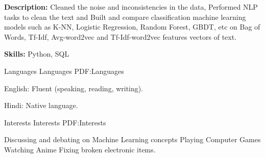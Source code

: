 \documentclass[letterpaper,MMMyyyy,nonstopmode]{simpleresumecv}
\begin{document}
\begin{Body}
            \Gap

            \Item
                \textbf{Description:}
                Cleaned the noise and inconsistencies in the data, 
                Performed NLP tasks to clean the text and 
                Built and compare classification machine learning models 
                such as K-NN, Logistic Regression, Random Forest, GBDT, etc  
                on Bag of Words, Tf-Idf, Avg-word2vec and Tf-Idf-word2vec 
                features vectors of text.
            
            \Gap

            \Item
                \textbf{Skills:}
                Python, SQL
         
        
    
    \Section
    {Languages}
    {Languages}
    {PDF:Languages}
    
        \BulletItem
        English:  Fluent (speaking, reading, writing).
        
        
        \Gap
        \BulletItem
        Hindi: Native language.
    
    
    \Section
    {Interests}
    {Interests}
    {PDF:Interests}
    
        \Entry
        \BulletItem
            Discussing and debating on Machine Learning concepts
        \BulletItem
            Playing Computer Games
        \BulletItem
            Watching Anime
        \BulletItem
            Fixing broken electronic items.
    
    \end{Body}
    
    
\end{document}
